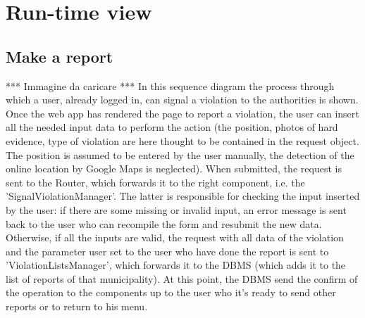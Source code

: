     \section{Run-time view}
        \subsection{Make a report}
        ***
        Immagine da caricare
        ***
        In this sequence diagram the process through which a user, already logged 
        in, can signal a violation to the authorities is shown. Once the web app 
        has rendered the page to report a violation, the user can insert all the
        needed input data to perform the action (the position, photos of hard evidence, 
        type of violation are here thought to be contained in the request object. 
        The position is assumed to be entered by the user manually, the detection of 
        the online location by Google Maps is neglected). When submitted, the request 
        is sent to the Router, which forwards it to the right component, i.e. the 
        'SignalViolationManager'. The latter is responsible for checking the input 
        inserted by the user: if there are some missing or invalid input, an error 
        message is sent back to the user who can recompile the form and resubmit the 
        new data. Otherwise, if all the inputs are valid, the request with all data of 
        the violation and the parameter user set to the user who have done the report 
        is sent to 'ViolationListsManager', which forwards it to the DBMS (which adds 
        it to the list of reports of that municipality). At this point, the DBMS send 
        the confirm of the operation to the components up to the user who it's ready to 
        send other reports or to return to his menu.

